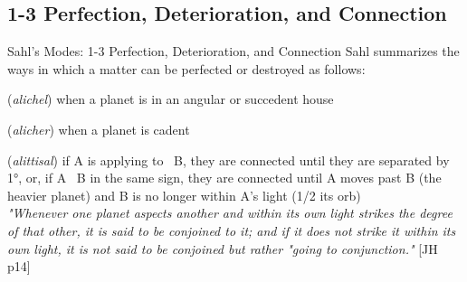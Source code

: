 \subsection{1-3 Perfection, Deterioration, and Connection}
\begin{frame}[t]{Sahl's Modes: 1-3 Perfection, Deterioration, and Connection}
Sahl summarizes the ways in which a matter can be perfected or destroyed as follows:\footnotemark[1]

\begin{description}[style=nextline]
\item[1. Perfection or Advance] (\textsl{alichel}) when a planet is in an angular or succedent house

\item[2. Deterioration or Retreat] (\textsl{alicher}) when a planet is cadent

\item[3. Conjunction or Connection] (\textsl{alittisal}) if A is applying to \Conjunction\ B, they are connected until they are separated by 1°, or, if A \Conjunction\ B in the same sign, they are connected until A moves past B (the heavier planet) and B is no longer within A's light (1/2 its orb) \\
\vspace{1em}
\textsl{"Whenever one planet aspects another and within its own light strikes the degree of that other, it is said to be conjoined to it; and if it does not strike it within its own light, it is not said to be conjoined but rather "going to conjunction."} [JH p14]\\

\end{description}

\end{frame}
